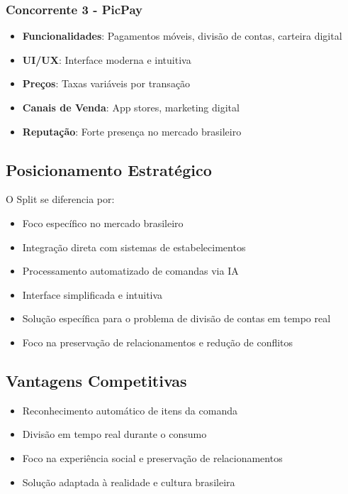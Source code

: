 \documentclass[12pt,a4paper]{article}
\begin{document}
\subsubsection{Concorrente 3 - PicPay}
\begin{itemize}
    \item \textbf{Funcionalidades}: Pagamentos móveis, divisão de contas, carteira digital
    \item \textbf{UI/UX}: Interface moderna e intuitiva
    \item \textbf{Preços}: Taxas variáveis por transação
    \item \textbf{Canais de Venda}: App stores, marketing digital
    \item \textbf{Reputação}: Forte presença no mercado brasileiro
\end{itemize}

\subsection{Posicionamento Estratégico}
O Split se diferencia por:
\begin{itemize}
    \item Foco específico no mercado brasileiro
    \item Integração direta com sistemas de estabelecimentos
    \item Processamento automatizado de comandas via IA
    \item Interface simplificada e intuitiva
    \item Solução específica para o problema de divisão de contas em tempo real
    \item Foco na preservação de relacionamentos e redução de conflitos
\end{itemize}

\subsection{Vantagens Competitivas}
\begin{itemize}
    \item Reconhecimento automático de itens da comanda
    \item Divisão em tempo real durante o consumo
    \item Foco na experiência social e preservação de relacionamentos
    \item Solução adaptada à realidade e cultura brasileira
\end{itemize}
\end{document}
